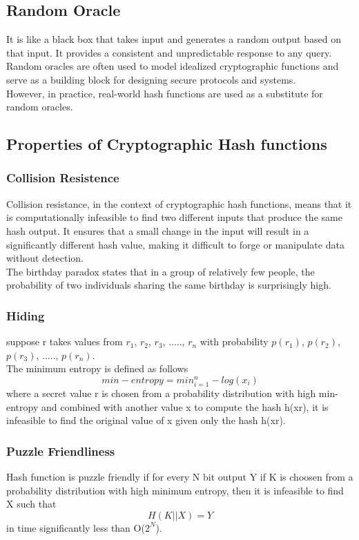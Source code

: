 \documentclass{article}
\begin{document}
\subsection{Random Oracle}
It is like a black box that takes input and generates a random output based on that input. It provides a consistent and unpredictable response to any query. Random oracles are often used to model idealized cryptographic functions and serve as a building block for designing secure protocols and systems. \\
However, in practice, real-world hash functions are used as a substitute for random oracles.
\subsection{Properties of Cryptographic Hash functions}
\subsubsection{Collision Resistence}
Collision resistance, in the context of cryptographic hash functions, means that it is computationally infeasible to find two different inputs that produce the same hash output. It ensures that a small change in the input will result in a significantly different hash value, making it difficult to forge or manipulate data without detection. \\
The birthday paradox states that in a group of relatively few people, the probability of two individuals sharing the same birthday is surprisingly high.
\subsubsection{Hiding}
suppose r takes values from $r_1$, $r_2$, $r_3$, ....., $r_n$ with probability  $p(r_1)$, $p(r_2)$, $p(r_3)$, ....., $p(r_n)$. \\
The minimum entropy is defined as follows 
$$min-entropy = min_{i=1}^{n} -log(x_i)$$
where a secret value r is chosen from a probability distribution with high min-entropy and combined with another value x to compute the hash h(x\textbar\textbar r), it is infeasible to find the original value of x given only the hash h(x\textbar\textbar r). \\
\subsubsection{Puzzle Friendliness}
Hash function is puzzle friendly if for every N bit output Y if K is choosen from a probability distribution with high minimum entropy, then it is infeasible to find X such that 
$$H(K||X) = Y$$
in time significantly less than O($2^N$).
\end{document}

